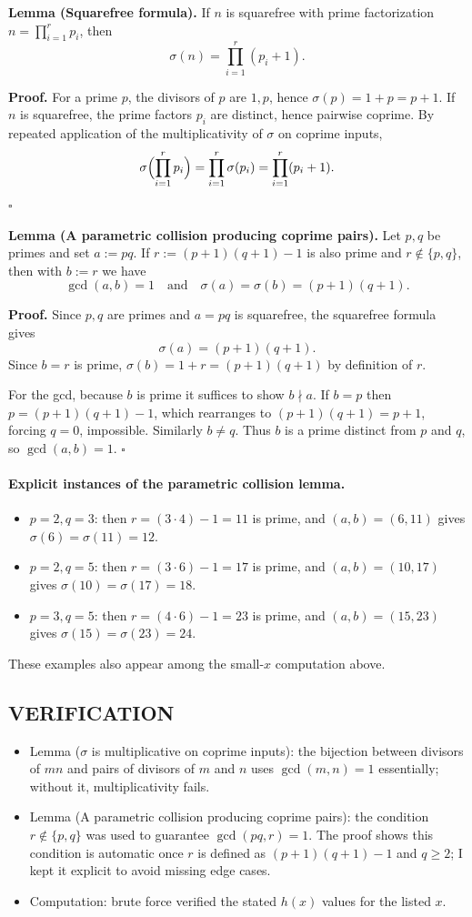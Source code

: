 \noindent\textbf{Lemma (Squarefree formula).}
If $n$ is squarefree with prime factorization $n=\prod_{i=1}^r p_i$, then
\[
\sigma(n)=\prod_{i=1}^r (p_i+1).
\]

\noindent\textbf{Proof.}
For a prime $p$, the divisors of $p$ are $1,p$, hence $\sigma(p)=1+p=p+1$.
If $n$ is squarefree, the prime factors $p_i$ are distinct, hence pairwise coprime. By repeated application of the multiplicativity of $\sigma$ on coprime inputs,
\[
\sigma\Bigl(\prod_{i=1}^r p_i\Bigr)=\prod_{i=1}^r \sigma(p_i)=\prod_{i=1}^r (p_i+1).
\]
\hfill$\square$


\noindent\textbf{Lemma (A parametric collision producing coprime pairs).}
Let $p,q$ be primes and set $a:=pq$. If $r:=(p+1)(q+1)-1$ is also prime and $r\notin\{p,q\}$, then with $b:=r$ we have
\[
\gcd(a,b)=1\quad\text{and}\quad \sigma(a)=\sigma(b)=(p+1)(q+1).
\]

\noindent\textbf{Proof.}
Since $p,q$ are primes and $a=pq$ is squarefree, the squarefree formula gives
\[
\sigma(a)=(p+1)(q+1).
\]
Since $b=r$ is prime, $\sigma(b)=1+r=(p+1)(q+1)$ by definition of $r$.

For the gcd, because $b$ is prime it suffices to show $b\nmid a$. If $b=p$ then
$p=(p+1)(q+1)-1$, which rearranges to $(p+1)(q+1)=p+1$, forcing $q=0$, impossible. Similarly $b\ne q$.
Thus $b$ is a prime distinct from $p$ and $q$, so $\gcd(a,b)=1$.
\hfill$\square$


\paragraph{Explicit instances of the parametric collision lemma.}
\begin{itemize}
\item $p=2,q=3$: then $r=(3\cdot 4)-1=11$ is prime, and $(a,b)=(6,11)$ gives $\sigma(6)=\sigma(11)=12$.
\item $p=2,q=5$: then $r=(3\cdot 6)-1=17$ is prime, and $(a,b)=(10,17)$ gives $\sigma(10)=\sigma(17)=18$.
\item $p=3,q=5$: then $r=(4\cdot 6)-1=23$ is prime, and $(a,b)=(15,23)$ gives $\sigma(15)=\sigma(23)=24$.
\end{itemize}
These examples also appear among the small-$x$ computation above.

\subsection*{VERIFICATION}
\begin{itemize}
\item Lemma ($\sigma$ is multiplicative on coprime inputs): the bijection between divisors of $mn$ and pairs of divisors of $m$ and $n$ uses $\gcd(m,n)=1$ essentially; without it, multiplicativity fails.
\item Lemma (A parametric collision producing coprime pairs): the condition $r\notin\{p,q\}$ was used to guarantee $\gcd(pq,r)=1$. The proof shows this condition is automatic once $r$ is defined as $(p+1)(q+1)-1$ and $q\ge 2$; I kept it explicit to avoid missing edge cases.
\item Computation: brute force verified the stated $h(x)$ values for the listed $x$.
\end{itemize}

